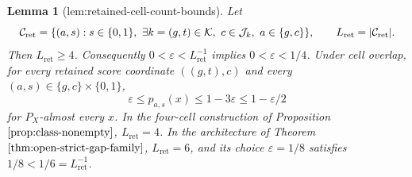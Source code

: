 \documentclass{article}
\newtheorem{lemma}{Lemma}
\begin{document}
\begin{lemma}[lem:retained-cell-count-bounds]\label{lem:retained-cell-count-bounds}
Let
\[
\makebox[\linewidth][c]{\resizebox{0.98\linewidth}{!}{\(\displaystyle \mathcal C_{\mathrm{ret}}
=\{(a,s):s\in\{0,1\},\ \exists k=(g,t)\in\mathcal K,\ c\in\mathcal J_k,\ a\in\{g,c\}\},
\qquad L_{\mathrm{ret}}=|\mathcal C_{\mathrm{ret}}|.\)}}
\]
Then \(L_{\mathrm{ret}}\ge4\). Consequently \(0<\varepsilon<L_{\mathrm{ret}}^{-1}\) implies \(0<\varepsilon<1/4\). Under cell overlap, for every retained score coordinate \(((g,t),c)\) and every \((a,s)\in\{g,c\}\times\{0,1\}\),
\[
\varepsilon\le p_{a,s}(x)\le1-3\varepsilon\le1-\varepsilon/2
\]
for \(P_X\)-almost every \(x\). In the four-cell construction of Proposition \(\ref{prop:class-nonempty}\), \(L_{\mathrm{ret}}=4\). In the architecture of Theorem \(\ref{thm:open-strict-gap-family}\), \(L_{\mathrm{ret}}=6\), and its choice \(\varepsilon=1/8\) satisfies \(1/8<1/6=L_{\mathrm{ret}}^{-1}\).
\end{lemma}
\end{document}
